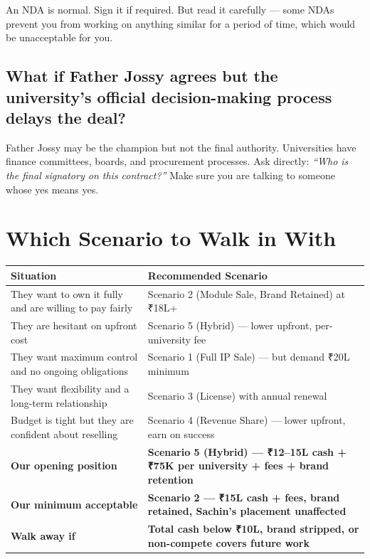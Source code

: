 \documentclass[12pt,a4paper]{article}
\begin{document}
    An NDA is normal. Sign it if required. But read it carefully — some NDAs prevent you from working on anything similar for a period of time, which would be unacceptable for you.

    \subsection{What if Father Jossy agrees but the university's official decision-making process delays the deal?}

    Father Jossy may be the champion but not the final authority. Universities have finance committees, boards, and procurement processes. Ask directly: \textit{``Who is the final signatory on this contract?''} Make sure you are talking to someone whose yes means yes.

    \newpage
    \section{Which Scenario to Walk in With}

    \begin{tabularx}{\textwidth}{L{3cm} X}
    \toprule
    \textbf{Situation} & \textbf{Recommended Scenario} \\
    \midrule
    They want to own it fully and are willing to pay fairly & Scenario 2 (Module Sale, Brand Retained) at ₹18L+ \\
    They are hesitant on upfront cost & Scenario 5 (Hybrid) — lower upfront, per-university fee \\
    They want maximum control and no ongoing obligations & Scenario 1 (Full IP Sale) — but demand ₹20L minimum \\
    They want flexibility and a long-term relationship & Scenario 3 (License) with annual renewal \\
    Budget is tight but they are confident about reselling & Scenario 4 (Revenue Share) — lower upfront, earn on success \\
    \midrule
    \textbf{Our opening position} & \textbf{Scenario 5 (Hybrid) — ₹12–15L cash + ₹75K per university + fees + brand retention} \\
    \textbf{Our minimum acceptable} & \textbf{Scenario 2 — ₹15L cash + fees, brand retained, Sachin's placement unaffected} \\
    \textbf{Walk away if} & \textbf{Total cash below ₹10L, brand stripped, or non-compete covers future work} \\
    \bottomrule
    \end{tabularx}
\end{document}

